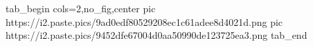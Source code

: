 
 
 
 
 
\zzSecCmtScr

\ifcmt
  tab_begin cols=2,no_fig,center
     pic https://i2.paste.pics/9ad0edf80529208ec1c61adee8d4021d.png
		 pic https://i2.paste.pics/9452dfe67004d0aa50990de123725ea3.png
  tab_end
\fi
